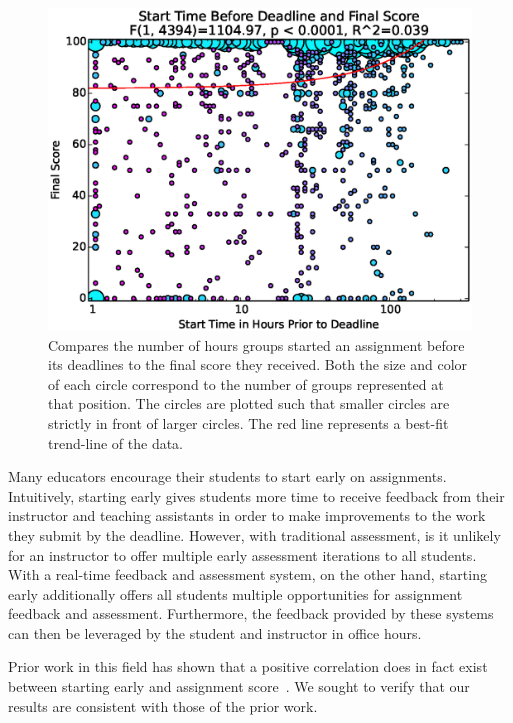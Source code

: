 \begin{figure}[!t]
\centering
\includegraphics[width=5.25in]{graphs/Start_Time_Before_Deadline_and_Final_Score.eps}
\caption{Compares the number of hours groups started an assignment before its
  deadlines to the final score they received. Both the size and color of each
  circle correspond to the number of groups represented at that position. The
  circles are plotted such that smaller circles are strictly in front of larger
  circles. The red line represents a best-fit trend-line of the data.}
\end{figure}

Many educators encourage their students to start early on
assignments. Intuitively, starting early gives students more time to receive
feedback from their instructor and teaching assistants in order to make
improvements to the work they submit by the deadline. However, with traditional
assessment, is it unlikely for an instructor to offer multiple early assessment
iterations to all students. With a real-time feedback and assessment system, on
the other hand, starting early additionally offers all students multiple
opportunities for assignment feedback and assessment. Furthermore, the feedback
provided by these systems can then be leveraged by the student and instructor
in office hours.

Prior work in this field has shown that a positive correlation does in fact
exist between starting early and assignment
score~\cite{Spacco:2013:TIP:2462476.2465594,
  Edwards:2009:CEI:1584322.1584325}. We sought to verify that our results are
consistent with those of the prior work.

